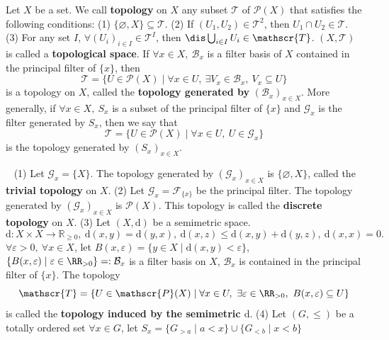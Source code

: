 \begin{definitionenv}
    Let $X$ be a set. We call \textbf{topology} on $X$ any subset $\mathscr{T}$ of $\mathscr{P}(X)$ that satisfies the following conditions:
     \newline
    (1) $\{\varnothing, X\} \subseteq \mathscr{T}$.
    \newline
    (2) If $(U_1,U_2)\in \mathscr{T}^2$, then $U_1\cap U_2\in \mathscr{T}$.
    \newline
    (3) For any set $I$,  $ \forall \left(U_i\right)_{i\in I}\in \mathscr{T}^I$, then $\dis \bigcup_{i\in I}U_i\in \mathscr{T}$.
    \newline
    $(X,\mathscr{T})$ is called a \textbf{topological space}.
    \newline
    If $\forall x\in X,\ \mathcal{B}_x$ is a filter basis of $X$ contained in the principal filter of $\{x\}$, then 
    $$\mathscr{T}=\{U\in \mathscr{P}(X)\mid \forall x\in U,\ \exists V_x\in \mathcal{B}_x,\ V_x\subseteq U\}$$
    is a topology on $X$, called the \textbf{topology generated by} $(\mathcal{B}_x)_{x\in X}$. More generally, if $\forall x\in X,\ S_x $ is a subset of the principal filter of $\{x\}$ and $\mathcal{G}_x$ is the filter generated by $S_x$, then we say that 
    $$\mathscr{T}=\{U\in\mathscr{P}(X)\mid \forall x\in U,\ U\in \mathcal{G}_x\}$$
    is the topology generated by $(S_x)_{x\in X}$.

\end{definitionenv}
\begin{exampleenv}
    \ \newline
    (1) Let $\mathcal{G}_x=\{X\}$. The topology generated by $\left(\mathcal{G}_x\right)_{x\in X}$ is $\{\varnothing,X\}$, called the \textbf{trivial topology} on $X$.  
    \newline
    (2) Let $\mathcal{G}_x=\mathcal{F}_{\{x\}}$ be the principal filter. The topology generated by $\left(\mathcal{G}_x\right)_{x\in X}$ is $\mathscr{P}(X)$. This topology is called the \textbf{discrete topology} on $X$.
    \newline
    (3) Let $(X,\mathrm{d})$ be a semimetric space. 
    $$\mathrm{d}:X\times X\longrightarrow \mathbb{R}_{\ge 0},\  \mathrm{d}(x,y)=\mathrm{d}(y,x),\ \mathrm{d}(x,z)\le \mathrm{d}(x,y)+\mathrm{d}(y,z),\ \mathrm{d}(x,x)=0.$$
    $\forall \varepsilon>0,\ \forall x\in X$, let $B(x,\varepsilon)=\{y\in X\mid \mathrm{d}(x,y)<\varepsilon\}$, $\{B(x,\varepsilon)\mid \varepsilon\in \RR_{>0}\}=: \mathcal{B}_x$ is a filter basis on $X$, $\mathcal{B}_x$ is contained in the principal filter of $\{x\}$. The topology 
    $$\mathscr{T}=\{U\in \mathscr{P}(X)\mid \forall x\in U,\ \exists \varepsilon\in \RR_{>0},\ B(x,\varepsilon)\subseteq U\}$$
    is called the \textbf{topology induced by the semimetric $\mathrm{d}$}.
    \newline
    (4) Let $(G,\le )$ be a totally ordered set $\forall x\in G$, let $S_x=\{G_{>a}\mid a<x\}\cup \{G_{<b}\mid x<b\}$
\end{exampleenv}
